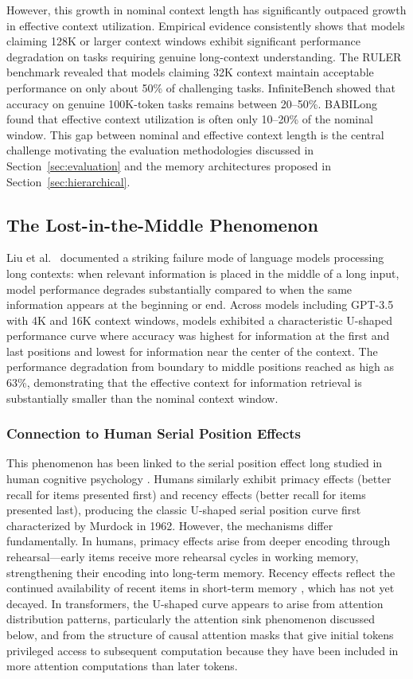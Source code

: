 \documentclass[11pt,letterpaper]{article}
\begin{document}
However, this growth in nominal context length has significantly outpaced growth in effective context utilization. Empirical evidence consistently shows that models claiming 128K or larger context windows exhibit significant performance degradation on tasks requiring genuine long-context understanding. The RULER benchmark revealed that models claiming 32K context maintain acceptable performance on only about 50\% of challenging tasks. InfiniteBench showed that accuracy on genuine 100K-token tasks remains between 20--50\%. BABILong found that effective context utilization is often only 10--20\% of the nominal window. This gap between nominal and effective context length is the central challenge motivating the evaluation methodologies discussed in Section~\ref{sec:evaluation} and the memory architectures proposed in Section~\ref{sec:hierarchical}.

\subsection{The Lost-in-the-Middle Phenomenon}

Liu et al.\ \cite{liu2024lost} documented a striking failure mode of language models processing long contexts: when relevant information is placed in the middle of a long input, model performance degrades substantially compared to when the same information appears at the beginning or end. Across models including GPT-3.5 with 4K and 16K context windows, models exhibited a characteristic U-shaped performance curve where accuracy was highest for information at the first and last positions and lowest for information near the center of the context. The performance degradation from boundary to middle positions reached as high as 63\%, demonstrating that the effective context for information retrieval is substantially smaller than the nominal context window.

\subsubsection{Connection to Human Serial Position Effects}

This phenomenon has been linked to the serial position effect long studied in human cognitive psychology \cite{murdock1962serial, glanzer1966two}. Humans similarly exhibit primacy effects (better recall for items presented first) and recency effects (better recall for items presented last), producing the classic U-shaped serial position curve first characterized by Murdock in 1962. However, the mechanisms differ fundamentally. In humans, primacy effects arise from deeper encoding through rehearsal---early items receive more rehearsal cycles in working memory, strengthening their encoding into long-term memory. Recency effects reflect the continued availability of recent items in short-term memory \cite{atkinson1968human}, which has not yet decayed. In transformers, the U-shaped curve appears to arise from attention distribution patterns, particularly the attention sink phenomenon discussed below, and from the structure of causal attention masks that give initial tokens privileged access to subsequent computation because they have been included in more attention computations than later tokens.
\end{document}
